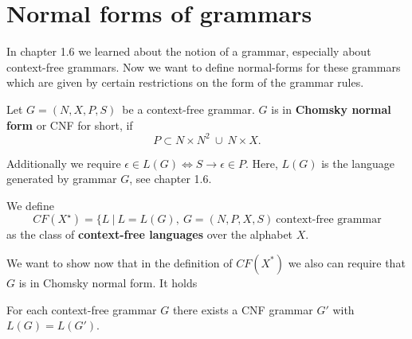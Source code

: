 \section{Normal forms of grammars}
In chapter 1.6 we learned about the notion of a grammar, especially about context-free grammars. Now we want to define normal-forms for these grammars which are given by certain restrictions on the form of the grammar rules.

\begin{definition}
Let $G = (N, X, P, S)$\ be a context-free grammar. $G$ is in \textbf{Chomsky normal form} or CNF for short, if
$$P \subset N \times N^{2}\  \cup\ N \times X.$$
\end{definition}

Additionally we require $\epsilon \in L(G) \iff S \rightarrow \epsilon \in P.$ Here, $L(G) $ is the language generated by grammar $G$, see chapter 1.6.

We define
$$
CF(X^{\star}) = \{ L\ |\ L = L(G),\ G = (N, P, X, S)\ \text{context-free grammar}
$$
as the class of \textbf{context-free languages} over the alphabet $X$.

We want to show now that in the definition of $CF(X^{*})$ we also can require that $G$ is in Chomsky normal form. It holds

\begin{theorem}
For each context-free grammar $G$ there exists a CNF grammar $G'$ with $L(G) = L(G')$.
\end{theorem}

